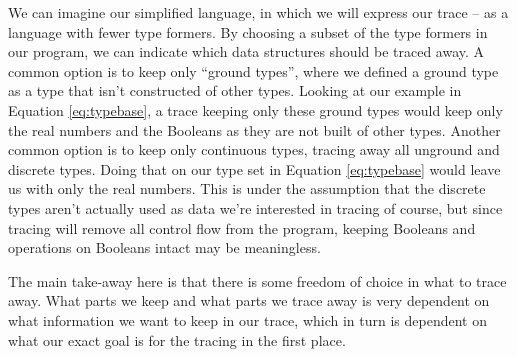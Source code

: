     We can imagine our simplified language, in which we will express our trace -- as a language with fewer type formers.
    By choosing a subset of the type formers in our program, we can indicate which data structures should be traced away.
    A common option is to keep only ``ground types'', where we defined a ground type as a type that isn't constructed of other types.
    Looking at our example in Equation \ref{eq:typebase}, a trace keeping only these ground types would keep only the real numbers and the Booleans as they are not built of other types.
    Another common option is to keep only continuous types, tracing away all unground and discrete types.
    Doing that on our type set in Equation \ref{eq:typebase} would leave us with only the real numbers.
    This is under the assumption that the discrete types aren't actually used as data we're interested in tracing of course, but since tracing will remove all control flow from the program, keeping Booleans and operations on Booleans intact may be meaningless. 

    The main take-away here is that there is some freedom of choice in what to trace away.
    What parts we keep and what parts we trace away is very dependent on what information we want to keep in our trace, which in turn is dependent on what our exact goal is for the tracing in the first place.
    
